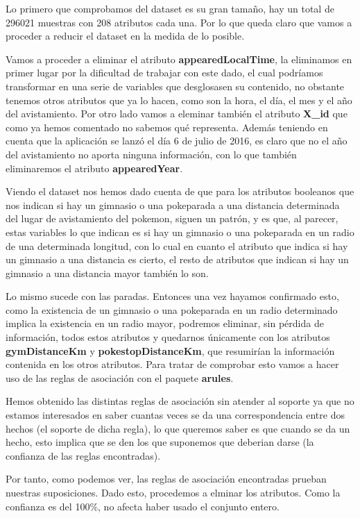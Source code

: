 Lo primero que comprobamos del dataset es su gran tamaño, hay un total de 296021 muestras con 208 atributos cada una. Por lo que queda claro que vamos a proceder a reducir el dataset en la medida de lo posible.

Vamos a proceder a eliminar el atributo \textbf{appearedLocalTime}, la eliminamos en primer lugar por la dificultad de trabajar con este dado, el cual podríamos transformar en una serie de variables que desglosasen su contenido, no obstante tenemos otros atributos que ya lo hacen, como son la hora, el día, el mes y el año del avistamiento. Por otro lado vamos a eleminar también el atributo \textbf{X\_id} que como ya hemos comentado no sabemos qué representa. Además teniendo en cuenta que la aplicación se lanzó el día 6 de julio de 2016, es claro que no el año del avistamiento no aporta ninguna información, con lo que también eliminaremos el atributo \textbf{appearedYear}.

Viendo el dataset nos hemos dado cuenta de que para los atributos booleanos que nos indican si hay un gimnasio o una pokeparada a una distancia determinada del lugar de avistamiento del pokemon, siguen un patrón, y es que, al parecer, estas variables lo que indican es si hay un gimnasio o una pokeparada en un radio de una determinada longitud, con lo cual en cuanto el atributo que indica si hay un gimnasio a una distancia es cierto, el resto de atributos que indican si hay un gimnasio a una distancia mayor también lo son. 

Lo mismo sucede con las paradas. Entonces una vez hayamos confirmado esto, como la existencia de un gimnasio o una pokeparada en un radio determinado implica la existencia en un radio mayor, podremos eliminar, sin pérdida de información, todos estos atributos y quedarnos únicamente con los atributos \textbf{gymDistanceKm} y \textbf{pokestopDistanceKm}, que resumirían la información contenida en los otros atributos. Para tratar de comprobar esto vamos a hacer uso de las reglas de asociación con el paquete \textbf{arules}.

Hemos obtenido las distintas reglas de asociación sin atender al soporte ya que no estamos interesados en saber cuantas veces se da una correspondencia entre dos hechos (el soporte de dicha regla), lo que queremos saber es que cuando se da un hecho, esto implica que se den los que suponemos que deberian darse (la confianza de las reglas encontradas). 

Por tanto, como podemos ver, las reglas de asociación encontradas prueban nuestras suposiciones. Dado esto, procedemos a elminar los atributos. Como la confianza es del 100\%, no afecta haber usado el conjunto entero.

